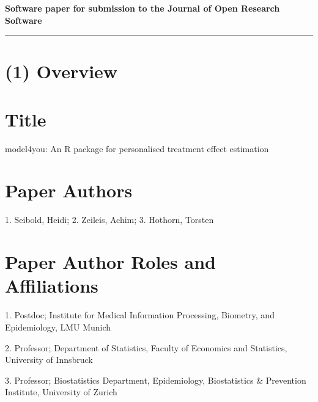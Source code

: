 \documentclass{josr}\usepackage[]{graphicx}\usepackage[]{color}
\newcommand{\new}[1]{{\color{blue} #1}}
\begin{document}
\hypersetup{pageanchor=false}





{\bf Software paper for submission to the Journal of Open Research Software} \\



\rule{\textwidth}{1pt}

\section*{(1) Overview}

\vspace{0.5cm}

\section*{Title}
model4you: An R package for personalised treatment effect estimation


\section*{Paper Authors}
1. Seibold, Heidi; 2. Zeileis, Achim; 3. Hothorn, Torsten



\section*{Paper Author Roles and Affiliations}
1. \new{Postdoc; Institute for Medical
Information Processing, Biometry, and Epidemiology, LMU Munich}

2. Professor; Department of Statistics, Faculty of Economics and Statistics,
University of Innsbruck

3. Professor; Biostatistics Department, Epidemiology, Biostatistics \&
Prevention Institute, University of Zurich
\end{document}
